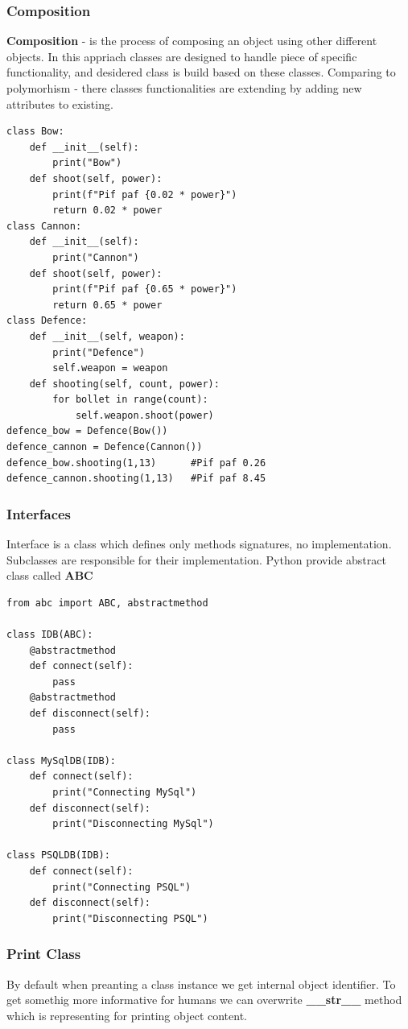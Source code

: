 \documentclass{article}
\begin{document}
\subsubsection{Composition}
\textbf{Composition} - is the process of composing an object using other different objects. In this appriach classes are designed to handle piece of specific functionality, and desidered class is build based on these classes. Comparing to polymorhism - there classes functionalities are extending by adding new attributes to existing.
\begin{lstlisting}[style=pystyle]
class Bow:
	def __init__(self):
		print("Bow")
	def shoot(self, power):
		print(f"Pif paf {0.02 * power}")
		return 0.02 * power
class Cannon:
	def __init__(self):
		print("Cannon")
	def shoot(self, power):
		print(f"Pif paf {0.65 * power}")
		return 0.65 * power
class Defence:
	def __init__(self, weapon):
		print("Defence")
		self.weapon = weapon
	def shooting(self, count, power):
		for bollet in range(count):
			self.weapon.shoot(power)
defence_bow = Defence(Bow())
defence_cannon = Defence(Cannon())
defence_bow.shooting(1,13)		#Pif paf 0.26
defence_cannon.shooting(1,13)	#Pif paf 8.45
\end{lstlisting}

\subsubsection{Interfaces}
Interface is a class which defines only methods signatures, no implementation. Subclasses are responsible for their implementation. Python provide abstract class called \textbf{ABC}
\begin{lstlisting}[style=pystyle]
from abc import ABC, abstractmethod

class IDB(ABC):
    @abstractmethod
    def connect(self):
        pass
    @abstractmethod
    def disconnect(self):
        pass

class MySqlDB(IDB):
    def connect(self):
        print("Connecting MySql")
    def disconnect(self):
        print("Disconnecting MySql")

class PSQLDB(IDB):
    def connect(self):
        print("Connecting PSQL")
    def disconnect(self):
        print("Disconnecting PSQL")

\end{lstlisting}



\subsubsection{Print Class}
By default when preanting a class instance we get internal object identifier. To get somethig more informative for humans we can overwrite \textbf{\_\_str\_\_} method which is representing for printing object content.
\end{document}
